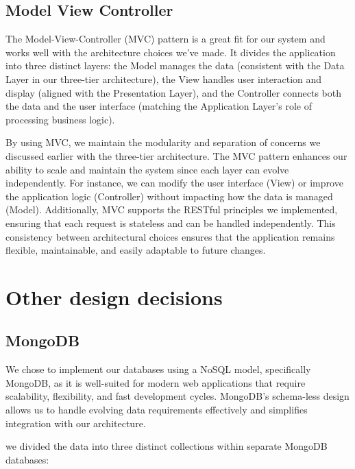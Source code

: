 \subsection{Model View Controller}
The Model-View-Controller (MVC) pattern is a great fit for our system and works well with the architecture choices we've made. It divides the application into three distinct layers: the Model manages the data (consistent with the Data Layer in our three-tier architecture), the View handles user interaction and display (aligned with the Presentation Layer), and the Controller connects both the data and the user interface (matching the Application Layer’s role of processing business logic).

By using MVC, we maintain the modularity and separation of concerns we discussed earlier with the three-tier architecture. The MVC pattern enhances our ability to scale and maintain the system since each layer can evolve independently. For instance, we can modify the user interface (View) or improve the application logic (Controller) without impacting how the data is managed (Model). Additionally, MVC supports the RESTful principles we implemented, ensuring that each request is stateless and can be handled independently. This consistency between architectural choices ensures that the application remains flexible, maintainable, and easily adaptable to future changes.

\pagebreak
\section{Other design decisions }
\subsection{MongoDB}

We chose to implement our databases using a NoSQL model, specifically MongoDB, as it is well-suited for modern web applications that require scalability, flexibility, and fast development cycles. MongoDB’s schema-less design allows us to handle evolving data requirements effectively and simplifies integration with our architecture.

 we divided the data into three distinct collections within separate MongoDB databases:

